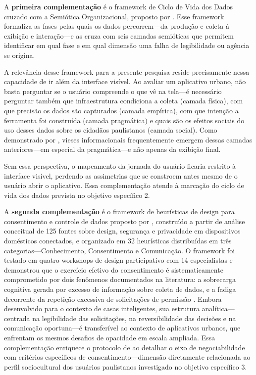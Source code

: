 \documentclass[
	12pt,				%
	oneside,			%
	a4paper,			%
	english,			%
	brazil				%
	]{abntex2ppgsi}
\begin{document}
    A \textbf{primeira complementação} é o framework de Ciclo  de Vida dos Dados cruzado com a Semiótica Organizacional, proposto por . Esse framework formaliza as fases pelas quais os dados percorrem---da produção e coleta à exibição e interação---e as cruza com seis camadas semióticas que permitem identificar em qual fase e em qual dimensão uma falha de legibilidade ou agência se origina.

    A relevância desse framework para a presente pesquisa reside precisamente nessa capacidade de ir além da interface visível. Ao avaliar um aplicativo urbano, não basta perguntar se o usuário compreende o que vê na tela---é necessário perguntar também que infraestrutura condiciona a coleta (camada física), com que precisão os dados são capturados (camada empírica), com que intenção a ferramenta foi construída (camada pragmática) e quais são os efeitos sociais do uso desses dados sobre os cidadãos paulistanos (camada social). Como demonstrado por , vieses informacionais frequentemente emergem dessas camadas anteriores---em especial da pragmática---e não apenas da exibição final.

    Sem essa perspectiva, o mapeamento da jornada do usuário ficaria restrito à interface visível, perdendo as assimetrias que se constroem antes mesmo de o usuário abrir o aplicativo. Essa complementação atende à marcação do ciclo de vida dos dados prevista no objetivo específico 2.

    A \textbf{segunda complementação} é o framework de heurísticas de design para consentimento e controle de dados proposto por , construído a partir de análise conceitual de 125 fontes sobre design, segurança e privacidade em dispositivos domésticos conectados, e organizado em 32 heurísticas distribuídas em três categorias---Conhecimento, Consentimento e Comunicação. O framework foi testado em quatro workshops de design participativo com 14 especialistas e demonstrou que o exercício efetivo do consentimento é sistematicamente comprometido por dois fenômenos documentados na literatura: a sobrecarga cognitiva gerada por excesso de informação sobre coleta de dados, e a fadiga decorrente da repetição excessiva de solicitações de permissão \cite{chalhoub2024useful, cezar2023cognitive}. Embora desenvolvido para o contexto de casas inteligentes, sua estrutura analítica---centrada na legibilidade das solicitações, na reversibilidade das decisões e na comunicação oportuna---é transferível ao contexto de aplicativos urbanos, que enfrentam os mesmos desafios de opacidade em escala ampliada. Essa complementação enriquece o protocolo de  ao detalhar o eixo de negociabilidade com critérios específicos de consentimento---dimensão diretamente relacionada ao perfil sociocultural dos usuários paulistanos investigado no objetivo específico 3.
\end{document}

